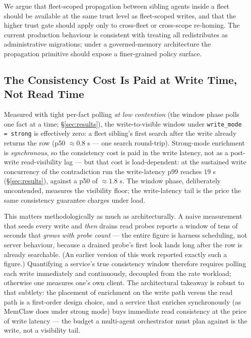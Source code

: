 \documentclass[10pt,twocolumn,letterpaper]{article}
\begin{document}
We argue that fleet-scoped propagation between sibling agents inside a fleet should be available at the same trust level as fleet-scoped writes, and that the higher trust gate should apply only to cross-fleet or cross-scope re-homing. The current production behaviour is consistent with treating all redistributes as administrative migrations; under a governed-memory architecture the propagation primitive should expose a finer-grained policy surface.

\subsection{The Consistency Cost Is Paid at Write Time, Not Read Time}

Measured with tight per-fact polling \emph{at low contention} (the window phase polls one fact at a time; \S\ref{sec:results}), the write-to-visible window under \texttt{write\_mode\,=\,strong} is effectively zero: a fleet sibling's first search after the write already returns the row (p50 \(\approx 0.8\) s --- one search round-trip). Strong-mode enrichment is \emph{synchronous}, so the consistency cost is paid in the write latency, not as a post-write read-visibility lag --- but that cost is load-dependent: at the sustained write concurrency of the contradiction run the write-latency p99 reaches \(19\) s (\S\ref{sec:results}), against a p50 of \(\approx\!1.8\) s. The window phase, deliberately uncontended, measures the visibility floor; the write-latency tail is the price the same consistency guarantee charges under load.

This matters methodologically as much as architecturally. A naive measurement that seeds every write and \emph{then} drains read probes reports a window of tens of seconds that \emph{grows with probe count} --- the entire figure is harness scheduling, not server behaviour, because a drained probe's first look lands long after the row is already searchable. (An earlier version of this work reported exactly such a figure.) Quantifying a service's true consistency window therefore requires polling each write immediately and continuously, decoupled from the rate workload; otherwise one measures one's own client. The architectural takeaway is robust to that subtlety: the placement of enrichment on the write path versus the read path is a first-order design choice, and a service that enriches synchronously (as MemClaw does under strong mode) buys immediate read consistency at the price of write latency --- the budget a multi-agent orchestrator must plan against is the write, not a visibility tail.
\end{document}
